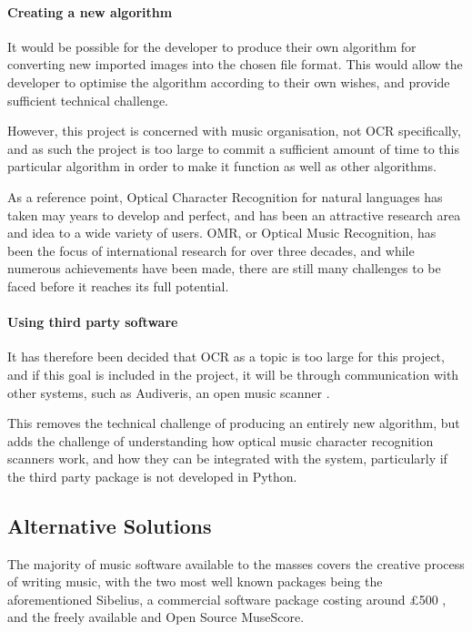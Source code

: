 \paragraph{Creating a new algorithm}
It would be possible for the developer to produce their own algorithm for converting new imported images into the chosen file format. This would allow the developer to optimise the algorithm according to their own wishes, and provide sufficient technical challenge.

However, this project is concerned with music organisation, not OCR specifically, and as such the project is too large to commit a sufficient amount of time to this particular algorithm in order to make it function as well as other algorithms. 

As a reference point, Optical Character Recognition for natural languages has taken may years to develop and perfect, and has been an attractive research area and idea to a wide variety of users\parencite{InternationalConf}. OMR, or Optical Music Recognition, has been the focus of international research for over three decades, and while numerous achievements have been made, there are still many challenges to be faced before it reaches its full potential\parencite{musicocr}. 

\paragraph{Using third party software}
It has therefore been decided that OCR as a topic is too large for this project, and if this goal is included in the project, it will be through communication with other systems, such as Audiveris, an open music scanner \parencite{audiveris}. 

This removes the technical challenge of producing an entirely new algorithm, but adds the challenge of understanding how optical music character recognition scanners work, and how they can be integrated with the system, particularly if the third party package is not developed in Python.
\subsection{Alternative Solutions}
The majority of music software available to the masses covers the creative process of writing music, with the two most well known packages being the aforementioned Sibelius, a commercial software package costing around £500 \parencite{avid}, and the freely available and Open Source MuseScore\parencite{MuseTour}.